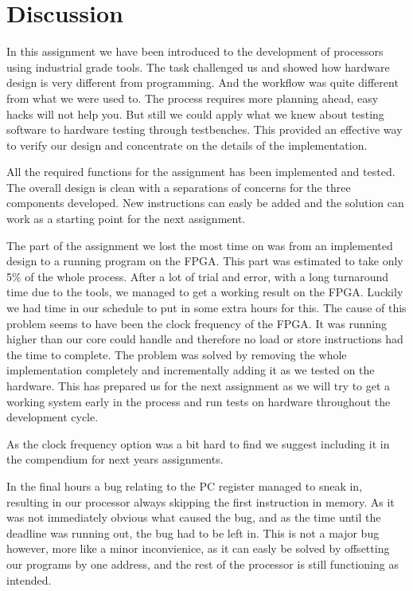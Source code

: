 \section{Discussion}

In this assignment we have been introduced to the development of processors using 
industrial grade tools. The task challenged us and showed how hardware design is
very different from programming. And the workflow was quite different from what we
were used to. The process requires more planning ahead, easy hacks will not help you.
But still we could apply what we knew about testing software to hardware testing 
through testbenches. This provided an effective way to verify our design and concentrate
on the details of the implementation. 

All the required functions for the assignment has been implemented and tested. The
overall design is clean with a separations of concerns for the three components developed. 
New instructions can easly be added and the solution can work as a starting point for the
next assignment. 

The part of the assignment we lost the most time on was from an implemented design to a running
program on the FPGA. This part was estimated to take only 5\% of the whole process. 
After a lot of trial and error, with a long turnaround time due to the tools, we managed to get 
a working result on the FPGA. Luckily we had time in our schedule to put in some extra hours for this.
The cause of this problem seems to have been the clock frequency of the FPGA. It was running higher 
than our core could handle and therefore no load or store instructions had the time to complete. 
The problem was solved by removing the whole implementation completely and incrementally adding
it as we tested on the hardware. This has prepared us for the next assignment as we will try
to get a working system early in the process and run tests on hardware throughout the development
cycle. 

As the clock frequency option was a bit hard to find we suggest including it in the compendium
for next years assignments. 

In the final hours a bug relating to the PC register managed to sneak in, resulting in our processor always skipping the
first instruction in memory. As it was not immediately obvious what caused the bug, and as the time until the deadline was
running out, the bug had to be left in. This is not a major bug however, more like a minor inconvienice, as it can easly be 
solved by offsetting our programs by one address, and the rest of the processor is still functioning as intended.
